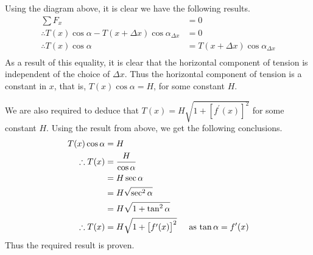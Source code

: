 \documentclass[a4paper]{article}
\begin{document}
\begin{enumerate}[label=\textbf{\arabic*.}]
\begin{enumerate}
\begin{center}
		\end{center}

		\bigbreak

		Using the diagram above, it is clear we have the following results.
		\begin{align*}
		\sum F_x & = 0\\
		\therefore T(x)\cos{\alpha} - T(x+\Delta x)\cos{\alpha_{\Delta x}} & = 0\\
		\therefore T(x)\cos{\alpha} & = T(x+\Delta x)\cos{\alpha_{\Delta x}}\\
		\end{align*}
		As a result of this equality, it is clear that the horizontal component of tension is independent of the choice of $\displaystyle{\Delta x}$. Thus the horizontal component of tension is a constant in $\displaystyle{x}$, that is, $\displaystyle{T(x)\cos{\alpha} = H}$, for some constant $\displaystyle{H}$.

		\bigbreak

		We are also required to deduce that $\displaystyle{T(x) = H\sqrt{1+\left[f^{\prime}(x)\right]^2}}$ for some constant $\displaystyle{H}$. Using the result from above, we get the following conclusions.
		\begin{align*}
		T(x)\cos{\alpha} & = H\\
		\therefore T(x) & = \frac{H}{\cos{\alpha}}\\
		& = H\sec{\alpha}\\
		& = H\sqrt{\sec^2{\alpha}}\\
		& = H\sqrt{1 + \tan^2{\alpha}}\\
		\therefore T(x) & = H\sqrt{1 + \big[f^{\prime}(x)\big]^2} \hspace{5mm} \text{as $\displaystyle{\tan{\alpha} = f^{\prime}(x)}$}\\
		\end{align*}
		Thus the required result is proven.


\end{enumerate}
\end{enumerate}
\end{document}
